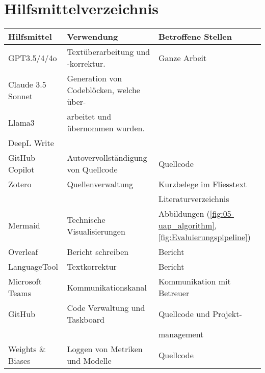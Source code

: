 \section*{Hilfsmittelverzeichnis}

\begin{table}[ht!]
    \centering
    \begin{tabular}{l|l|l}
        
        \hline
        \textbf{Hilfsmittel} & \textbf{Verwendung} & \textbf{Betroffene Stellen} \\ 

        \hline
        GPT3.5/4/4o & Textüberarbeitung und -korrektur. & Ganze Arbeit \\
        Claude 3.5 Sonnet & Generation von Codeblöcken, welche über- & \\
        Llama3 & arbeitet und übernommen wurden. & \\
        DeepL Write &  & \\

        \hline
        GitHub Copilot & Autovervollständigung von Quellcode & Quellcode \\ 

        \hline
        Zotero & Quellenverwaltung & Kurzbelege im Fliesstext \\ 
         & & Literaturverzeichnis \\
         
        \hline
        Mermaid & Technische Visualisierungen & Abbildungen (\ref{fig:05-uap_algorithm}, \ref{fig:Evaluierungspipeline})\\

        \hline
        Overleaf & Bericht schreiben & Bericht \\

        \hline
        LanguageTool & Textkorrektur & Bericht \\

        \hline
        Microsoft Teams & Kommunikationskanal & Kommunikation mit Betreuer \\

        \hline
        GitHub & Code Verwaltung und Taskboard & Quellcode und Projekt- \\
        & & management \\

        \hline
        Weights \& Biases & Loggen von Metriken und Modelle & Quellcode \\


\end{tabular}
\end{table}

